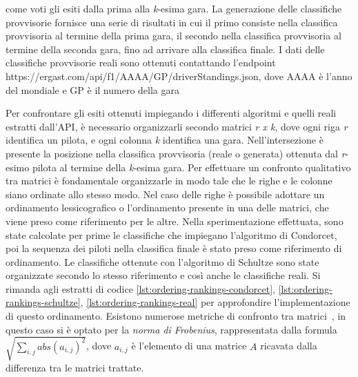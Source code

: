 \documentclass[12pt,a4paper,openright,twoside]{book}
\begin{document}
come voti gli esiti dalla prima alla \textit{k}-esima gara.
La generazione delle classifiche provvisorie fornisce una serie di risultati in
cui il primo consiste nella classifica provvisoria al termine della prima gara, il secondo nella classifica provvisoria al termine 
della seconda gara, fino ad arrivare alla classifica finale.
I dati delle classifiche provvisorie reali sono ottenuti contattando l'endpoint \newline https://ergast.com/api/f1/AAAA/GP/driverStandings.json,
dove AAAA è l'anno del mondiale e GP è il numero della gara

Per confrontare gli esiti ottenuti impiegando i differenti algoritmi e quelli reali estratti dall'API,
è necessario organizzarli secondo matrici \textit{r x k}, dove ogni riga \textit{r} identifica un pilota,
e ogni colonna \textit{k} identifica una gara. Nell'intersezione è presente la
posizione nella classifica provvisoria (reale o generata) ottenuta dal \textit{r}-esimo pilota al termine della
\textit{k}-esima gara.
Per effettuare un confronto qualitativo tra matrici è fondamentale organizzarle in modo tale che le righe e le colonne
siano ordinate allo stesso modo. Nel caso delle righe è possibile adottare un ordinamento lessicografico o 
l'ordinamento presente in una delle matrici, che viene preso come riferimento per le altre.
Nella sperimentazione effettuata, sono state calcolate per prime le classifiche che impiegano l'algoritmo di Condorcet,
poi la sequenza dei piloti nella classifica finale è stato preso come riferimento di ordinamento.
Le classifiche ottenute con l'algoritmo di Schultze sono state organizzate secondo lo stesso riferimento e così anche
le classifiche reali. Si rimanda agli estratti di codice \ref{lst:ordering-rankings-condorcet}, \ref{lst:ordering-rankings-schultze},
\ref{lst:ordering-rankings-real} per approfondire l'implementazione di questo ordinamento.
Esistono numerose metriche di confronto tra matrici~\cite{golub2013matrix}, in questo caso si è optato per la \textit{norma di Frobenius},
rappresentata dalla formula $\sqrt{\sum_{i,j}^{} abs(a_{i,j})^2}$, dove $a_{i,j}$ è l'elemento di una matrice $A$ ricavata dalla
differenza tra le matrici trattate.



\end{document}
